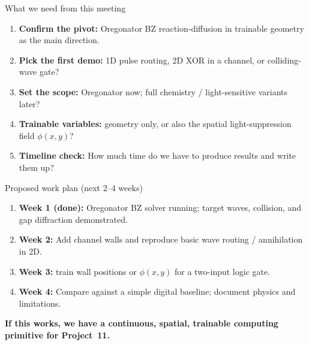 \documentclass[aspectratio=169,11pt]{beamer}
\begin{document}
\begin{frame}{What we need from this meeting}

\begin{enumerate}
    \item \textbf{Confirm the pivot:} Oregonator BZ reaction-diffusion in trainable geometry as the main direction.
    \item \textbf{Pick the first demo:} 1D pulse routing, 2D XOR in a channel, or colliding-wave gate?
    \item \textbf{Set the scope:} Oregonator now; full chemistry / light-sensitive variants later?
    \item \textbf{Trainable variables:} geometry only, or also the spatial light-suppression field $\phi(x,y)$?
    \item \textbf{Timeline check:} How much time do we have to produce results and write them up?
\end{enumerate}

\end{frame}

\begin{frame}{Proposed work plan (next 2--4 weeks)}

\begin{enumerate}
    \item \textbf{Week 1 (done):} Oregonator BZ solver running; target waves, collision, and gap diffraction demonstrated.
    \item \textbf{Week 2:} Add channel walls and reproduce basic wave routing / annihilation in 2D.
    \item \textbf{Week 3:} train wall positions or $\phi(x,y)$ for a two-input logic gate.
    \item \textbf{Week 4:} Compare against a simple digital baseline; document physics and limitations.
\end{enumerate}

\vspace{0.3cm}
\centering
\textbf{If this works, we have a continuous, spatial, trainable computing primitive for Project~11.}

\end{frame}
\end{document}
